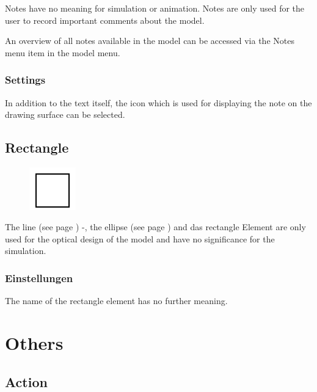 Notes have no meaning for simulation or animation.
Notes are only used for the user to record important comments about the model.

An overview of all notes available in the model can be accessed via
the Notes menu item in the model menu.

\subsection*{Settings}

In addition to the text itself, the icon which is used for displaying
the note on the drawing surface can be selected.


\section{Rectangle}
\label{ref:ModelElementRectangle}

\begin{figure}
\vspace{-22pt}
\includegraphics[width=2cm]{imageModelElementRectangle.png}
\vspace{-22pt}
\end{figure}

The line (see page \pageref{ref:ModelElementLine}) -, the ellipse (see page \pageref{ref:ModelElementEllipse}) and
das rectangle Element are only used for the optical design of the model and have no significance for the simulation.

\subsection*{Einstellungen}

The name of the rectangle element has no further meaning.





\chapter{Others}

\section{Action}
\label{ref:ModelElementAction}

